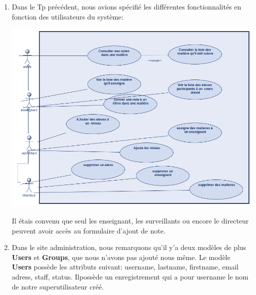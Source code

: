 \documentclass[11pt,a4paper]{article}
\begin{document}
\begin{enumerate}
\item Dans le Tp précédent, nous avions spécifié les différentes fonctionnalités en fonction des utilisateurs du système:
\begin{center}
\includegraphics[scale=0.4]{images/cas.png}
\end{center}
Il étais convenu que seul les enseignant, les surveillants ou encore le directeur peuvent avoir accès au formulaire d'ajout de note.
\item Dans le site administration, nous remarquons qu'il y'a deux modèles de plus \textbf{ Users} et \textbf{Groups}, que nous n'avons pas ajouté nous même. Le modèle \textbf{Users} possède les attributs suivant: username, lastname, firstname, email adress, staff, status. Ilpossède un enregistrement qui a pour username le nom de notre superutilisateur créé.


\end{enumerate}
\end{document}

